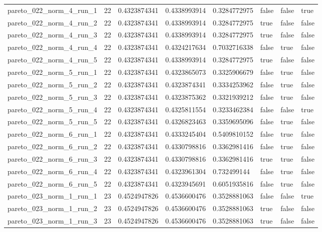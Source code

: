 \begin{tabular}{@{}llllllll@{}}
pareto\_022\_norm\_4\_run\_1 & 22 & 0.4323874341 & 0.4338993914 & 0.3284772975 & false & false & true \\
pareto\_022\_norm\_4\_run\_2 & 22 & 0.4323874341 & 0.4338993914 & 0.3284772975 & true & false & false \\
pareto\_022\_norm\_4\_run\_3 & 22 & 0.4323874341 & 0.4338993914 & 0.3284772975 & true & false & false \\
pareto\_022\_norm\_4\_run\_4 & 22 & 0.4323874341 & 0.4324217634 & 0.7032716338 & false & true & false \\
pareto\_022\_norm\_4\_run\_5 & 22 & 0.4323874341 & 0.4338993914 & 0.3284772975 & true & false & false \\
pareto\_022\_norm\_5\_run\_1 & 22 & 0.4323874341 & 0.4323865073 & 0.3325906679 & false & true & false \\
pareto\_022\_norm\_5\_run\_2 & 22 & 0.4323874341 & 0.4323874341 & 0.3334253962 & false & true & false \\
pareto\_022\_norm\_5\_run\_3 & 22 & 0.4323874341 & 0.4323875362 & 0.3321939212 & false & true & false \\
pareto\_022\_norm\_5\_run\_4 & 22 & 0.4323874341 & 0.4325811554 & 0.3233462384 & false & false & true \\
pareto\_022\_norm\_5\_run\_5 & 22 & 0.4323874341 & 0.4326823463 & 0.3359695096 & false & true & false \\
pareto\_022\_norm\_6\_run\_1 & 22 & 0.4323874341 & 0.4333245404 & 0.5409810152 & false & true & false \\
pareto\_022\_norm\_6\_run\_2 & 22 & 0.4323874341 & 0.4330798816 & 0.3362981416 & false & true & false \\
pareto\_022\_norm\_6\_run\_3 & 22 & 0.4323874341 & 0.4330798816 & 0.3362981416 & true & true & false \\
pareto\_022\_norm\_6\_run\_4 & 22 & 0.4323874341 & 0.4323961304 & 0.732499144 & false & true & false \\
pareto\_022\_norm\_6\_run\_5 & 22 & 0.4323874341 & 0.4323945691 & 0.6051935816 & false & true & false \\
pareto\_023\_norm\_1\_run\_1 & 23 & 0.4524947826 & 0.4536600476 & 0.3528881063 & false & false & true \\
pareto\_023\_norm\_1\_run\_2 & 23 & 0.4524947826 & 0.4536600476 & 0.3528881063 & true & false & false \\
pareto\_023\_norm\_1\_run\_3 & 23 & 0.4524947826 & 0.4536600476 & 0.3528881063 & true & false & false \\

\end{tabular}
